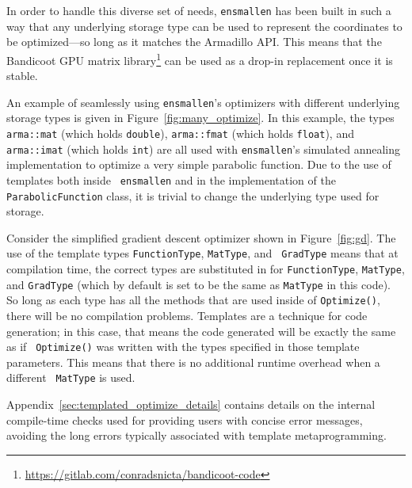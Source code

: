 In order to handle this diverse set of needs, {\tt ensmallen} has been built in
such a way that any underlying storage type can be used to represent the
coordinates to be optimized---so long as it matches the Armadillo API.
This means that the Bandicoot GPU matrix library\footnote{\url{https://gitlab.com/conradsnicta/bandicoot-code}}
can be used as a drop-in replacement once it is stable.

An example of seamlessly using {\tt ensmallen}'s optimizers with different
underlying storage types is given in Figure~\ref{fig:many_optimize}.  In this
example, the types {\tt arma::mat} (which holds {\tt double}), {\tt arma::fmat}
(which holds {\tt float}), and {\tt arma::imat} (which holds {\tt int}) are all
used with {\tt ensmallen}'s simulated annealing implementation to optimize a
very simple parabolic function.  Due to the use of templates both inside {\tt
ensmallen} and in the implementation of the {\tt ParabolicFunction} class, it is
trivial to change the underlying type used for storage.

Consider the simplified gradient descent optimizer shown in Figure~\ref{fig:gd}.
The use of the template types {\tt FunctionType}, {\tt MatType}, and {\tt
GradType} means that at compilation time, the correct types are substituted in
for {\tt FunctionType}, {\tt MatType}, and {\tt GradType} (which by default is
set to be the same as {\tt MatType} in this code).  So long as each type has all
the methods that are used inside of {\tt Optimize()}, there will be no
compilation problems.  Templates are a technique for code generation; in this
case, that means the code generated will be exactly the same as if {\tt
Optimize()} was written with the types specified in those template parameters.
This means that there is no additional runtime overhead when a different {\tt
MatType} is used.

Appendix~\ref{sec:templated_optimize_details} contains details on the internal
compile-time checks used for providing users with concise error messages, 
avoiding the long errors typically associated with template metaprogramming.
